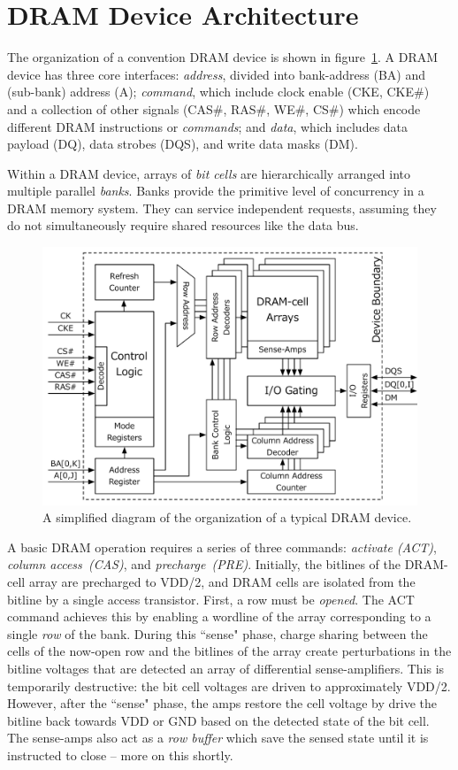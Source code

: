 \section{DRAM Device Architecture}\label{sec:dram-arch}

The organization of a convention DRAM device is shown in
figure~\ref{fig:dram-device}. A DRAM device has three core interfaces:
\emph{address}, divided into bank-address (BA) and (sub-bank) address (A);
\emph{command}, which include clock enable (CKE, CKE\#) and a collection of other
signals (CAS\#, RAS\#, WE\#, CS\#) which encode different DRAM instructions or
\emph{commands}; and \emph{data}, which includes data payload (DQ), data
strobes (DQS), and write data masks (DM).

Within a DRAM device, arrays of \emph{bit cells} are hierarchically arranged into multiple parallel
\emph{banks}.  Banks provide the primitive level of concurrency in a DRAM
memory system. They can service independent requests, assuming they do not
simultaneously require shared resources like the data bus.

\begin{figure}
	\centering
	\includegraphics[width=16cm]{figures/dram-device.pdf}
    \caption{A simplified diagram of the organization of a typical DRAM device.}
	\label{fig:dram-device}
\end{figure}

A basic DRAM operation requires a series of three commands: \emph{activate
(ACT)}, \emph{column access~(CAS)}, and \emph{precharge~(PRE)}. Initially, the
bitlines of the DRAM-cell array are precharged to VDD/2, and DRAM cells are
isolated from the bitline by a single access transistor. First, a row must be
\emph{opened}. The ACT command achieves this by enabling a wordline of the
array corresponding to a single \emph{row} of the bank. During this ``sense"
phase, charge sharing between the cells of the now-open row and the bitlines of
the array create perturbations in the bitline voltages that are detected an
array of differential sense-amplifiers.  This is temporarily destructive: the
bit cell voltages are driven to approximately VDD/2. However, after the
``sense" phase, the amps restore the cell voltage by drive the bitline back
towards VDD or GND based on the detected state of the bit cell. The sense-amps
also act as a \emph{row buffer} which save the sensed state until it is
instructed to close -- more on this shortly.

